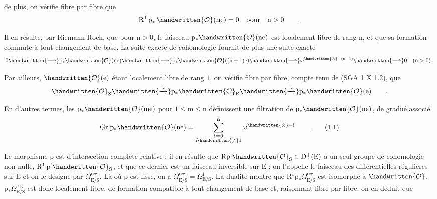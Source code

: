 de plus, on vérifie fibre par fibre que
\[
\mathrm{R}^{1}\,\mathrm{p}_{*}\,\handwritten{\mathcal{O}}(\mathrm{ne})=0\quad\text{pour}\quad\mathrm{n}>0\qquad.
\]

Il en résulte, par Riemann-Roch, que pour $\mathrm{n}>0$, le faisceau $\mathrm{p}_{*}\handwritten{\mathcal{O}}(\mathrm{ne})$ est looalement libre de rang $\mathrm{n}$, et que sa formation commute à tout changement de base. La suite exacte de cohomologie fournit de plus une suite exacte
\[
0\handwritten{\longrightarrow}\mathrm{p}_{*}\handwritten{\mathcal{O}}(\mathrm{ne})
\handwritten{\longrightarrow}\mathrm{p}_{*}\handwritten{\mathcal{O}}((\mathrm{n}+1)\mathrm{e})
\handwritten{\longrightarrow}\omega^{\handwritten{\otimes}-(\mathrm{n}+1)}
\handwritten{\longrightarrow}0\quad(\mathrm{n}>0)\,.
\]

Par ailleurs, $\handwritten{\mathcal{O}}(\mathrm{e})$ étant localement libre de rang $1$, on vérifie fibre par fibre, compte tenu de (SGA 1 X 1.2), que
\[
\handwritten{\mathcal{O}}_{\mathrm{S}}\handwritten{\xrightarrow{\sim}}
\mathrm{p}_{*}\handwritten{\mathcal{O}}_{\mathrm{E}}\handwritten{\xrightarrow{\sim}}
\mathrm{p}_{*}\handwritten{\mathcal{O}}(\mathrm{e})\qquad.
\]

En d'autres termes, les $\mathrm{p}_{*}\handwritten{\mathcal{O}}(\mathrm{me})$ pour $1\leq\mathrm{m}\leq\mathrm{n}$ définissent une filtration de $\mathrm{p}_{*}\handwritten{\mathcal{O}}(\mathrm{ne})$, de gradué associé
\makeatletter\tagsleft@true\makeatother
\[
\mathrm{Gr}\;\mathrm{p}_{*}\handwritten{\mathcal{O}}(\mathrm{ne})
=\sum_{\substack{\mathrm{i}=0\\\mathrm{i}\handwritten{\neq}1}}^{\mathrm{n}}\omega^{\handwritten{\otimes}-\mathrm{i}}\qquad.
\tag*{(1.1)}
\]

Le morphisme $\mathrm{p}$ est d'intersection complète relative ; il en résulte que $\mathrm{Rp}^{!}\handwritten{\mathcal{O}}_{\mathrm{S}}\in\mathrm{D}^{+}(\mathrm{E})$ a un seul groupe de cohomologie non nulle, $\mathrm{R}^{1}\,\mathrm{p}^{!}\handwritten{\mathcal{O}}_{\mathrm{S}}$, et que ce dernier est un faisceau inversible sur $\mathrm{E}$ ; on l'appelle le faisceau des différentielles régulières sur $\mathrm{E}$ et on le désigne par $\Omega^{\mathrm{reg}}_{\mathrm{E}/\mathrm{S}}$. Là où $\mathrm{p}$ est lisse, on a $\Omega^{\mathrm{reg}}_{\mathrm{E}/\mathrm{S}}=\Omega^{1}_{\mathrm{E}/\mathrm{S}}$. La dualité montre que $\mathrm{R}^{1}\mathrm{p}_{*}\Omega^{\mathrm{rcg}}_{\mathrm{E}/\mathrm{S}}$ est isomorphe à $\handwritten{\mathcal{O}}$, $\mathrm{p}_{*}\Omega^{\mathrm{reg}}_{\mathrm{E}/\mathrm{S}}$ est donc \handwritten{/} localement libre, de formation compatible à tout changement de base et, raisonnant fibre par fibre, on en déduit que
\clearpage
